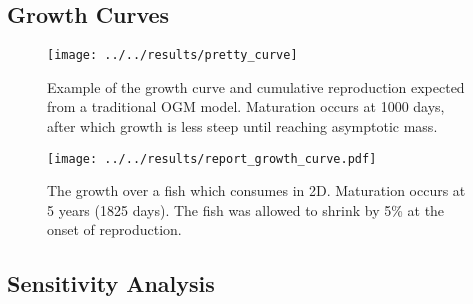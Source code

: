 \begin{refsection}
\subsection{Growth Curves}
	\begin{figure}[H]
	\centering 
	\texttt{[image: ../../results/pretty\_curve]}
	\caption{Example of the growth curve and cumulative reproduction expected from a traditional OGM model. Maturation occurs at 1000 days, after which growth is less steep until reaching asymptotic mass.  }
	\label{OGM_Curve}
\end{figure}

\begin{figure}[h]
	\centering
	\texttt{[image: ../../results/report\_growth\_curve.pdf]}
	\caption{The growth over a fish which consumes in 2D.  Maturation occurs at 5 years (1825 days).  The fish was allowed to shrink by 5\% at the onset of reproduction.}
	\label{growth_curve}
\end{figure}

\clearpage
\subsection{Sensitivity Analysis}

\end{refsection}
